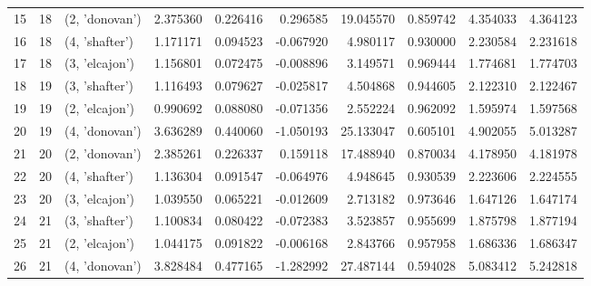 \begin{tabular}{lrlrrrrrrr}
15 &     18 &  (2, 'donovan') &  2.375360 &   0.226416 &  0.296585 &  19.045570 &  0.859742 &   4.354033 &  4.364123 \\
16 &     18 &  (4, 'shafter') &  1.171171 &   0.094523 & -0.067920 &   4.980117 &  0.930000 &   2.230584 &  2.231618 \\
17 &     18 &  (3, 'elcajon') &  1.156801 &   0.072475 & -0.008896 &   3.149571 &  0.969444 &   1.774681 &  1.774703 \\
18 &     19 &  (3, 'shafter') &  1.116493 &   0.079627 & -0.025817 &   4.504868 &  0.944605 &   2.122310 &  2.122467 \\
19 &     19 &  (2, 'elcajon') &  0.990692 &   0.088080 & -0.071356 &   2.552224 &  0.962092 &   1.595974 &  1.597568 \\
20 &     19 &  (4, 'donovan') &  3.636289 &   0.440060 & -1.050193 &  25.133047 &  0.605101 &   4.902055 &  5.013287 \\
21 &     20 &  (2, 'donovan') &  2.385261 &   0.226337 &  0.159118 &  17.488940 &  0.870034 &   4.178950 &  4.181978 \\
22 &     20 &  (4, 'shafter') &  1.136304 &   0.091547 & -0.064976 &   4.948645 &  0.930539 &   2.223606 &  2.224555 \\
23 &     20 &  (3, 'elcajon') &  1.039550 &   0.065221 & -0.012609 &   2.713182 &  0.973646 &   1.647126 &  1.647174 \\
24 &     21 &  (3, 'shafter') &  1.100834 &   0.080422 & -0.072383 &   3.523857 &  0.955699 &   1.875798 &  1.877194 \\
25 &     21 &  (2, 'elcajon') &  1.044175 &   0.091822 & -0.006168 &   2.843766 &  0.957958 &   1.686336 &  1.686347 \\
26 &     21 &  (4, 'donovan') &  3.828484 &   0.477165 & -1.282992 &  27.487144 &  0.594028 &   5.083412 &  5.242818 \\
\bottomrule
\end{tabular}
